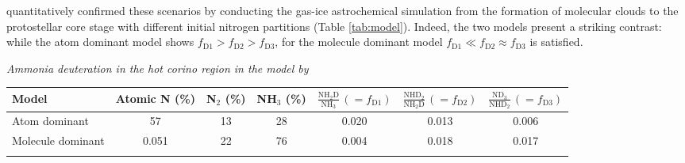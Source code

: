 \documentclass[12pt,a4paper]{article}  %
\begin{document}
\citet{Furuya18} quantitatively confirmed these scenarios by conducting the gas-ice astrochemical simulation from the formation of molecular clouds to the protostellar core stage with different initial nitrogen partitions (Table \ref{tab:model}). Indeed, the two models present a striking contrast: while the atom dominant model shows $f_\mathrm{D1} > f_\mathrm{D2} > f_\mathrm{D3}$, for the molecule dominant model $f_\mathrm{D1} \ll f_\mathrm{D2} \approx f_\mathrm{D3}$ is satisfied.

\vspace{-1.2em}
\begin{center}
\begin{threeparttable}[tbh]
\caption[]{\emph{Ammonia deuteration in the hot corino region in the model by \citet{Furuya18}}}
\begin{tabular}{lcccccc}
\hline \noalign {\smallskip}
Model  & Atomic N (\%) & N$_2$ (\%) & NH$_3$ (\%) & $\frac{\mathrm{NH_2D}}{\mathrm{NH_3}}\,(=f_\mathrm{D1})$ & $\frac{\mathrm{NHD_2}}{\mathrm{NH_2D}}\,(=f_\mathrm{D2})$ &
$\frac{\mathrm{ND_3}}{\mathrm{NHD_2}}\,(=f_\mathrm{D3})$\\
\hline \noalign {\smallskip}
Atom dominant & 57 & 13 & 28 & 0.020 & 0.013 & 0.006 \\
Molecule dominant & 0.051 & 22 & 76 & 0.004 & 0.018 & 0.017 \\
\hline \noalign {\smallskip}
\end{tabular}
\label{tab:model}
\end{threeparttable}
\end{center}
\vspace{-0.5em}


\end{document}
